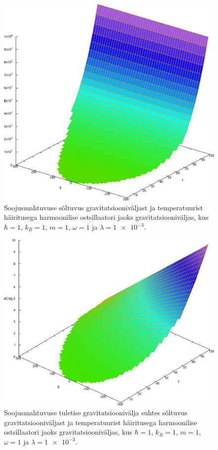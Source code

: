 \documentclass{trkut}%
\begin{document}
\begin{figure}[htb!]
    \includegraphics[width=\textwidth]{maxima/harh1k1m1w1l0001.pdf}
    \caption{Soojusmahtuvuse sõltuvus gravitatsiooniväljast ja temperatuurist häiritusega harmoonilise ostsillaatori jaoks gravitatsiooniväljas, kus $\hbar=1$, $k_B=1$, $m=1$, $\omega=1$ ja $\lambda=\num{1e-3}$.}
    \label{hjoon1}
\end{figure}

\begin{figure}[htb!]
    \includegraphics[width=\textwidth]{maxima/dcdgharh1k1m1w1l0001.pdf}
    \caption{Soojusmahtuvuse tuletise gravitatsioonivälja suhtes sõltuvus gravitatsiooniväljast ja temperatuurist häiritusega harmoonilise ostsillaatori jaoks gravitatsiooniväljas, kus $\hbar=1$, $k_B=1$, $m=1$, $\omega=1$ ja $\lambda=\num{1e-3}$.}
    \label{hjoon2}
\end{figure}
\end{document}
